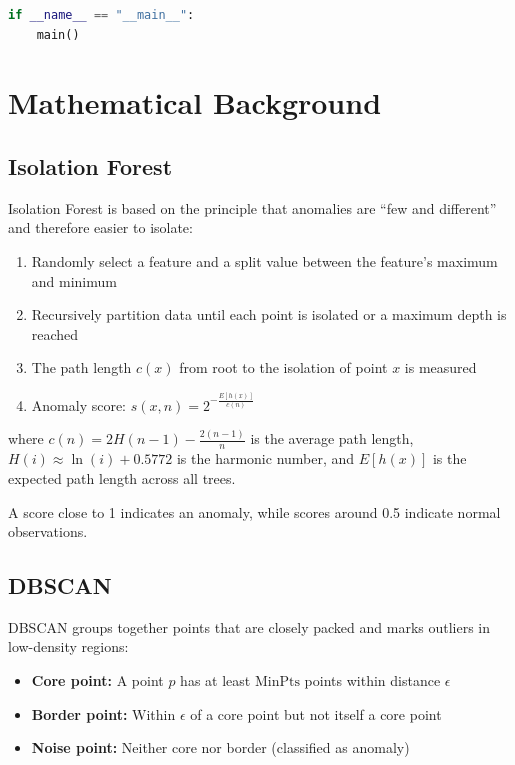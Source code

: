 \documentclass[12pt,a4paper]{report}
\begin{document}
\begin{lstlisting}[language=Python, caption={Main pipeline}]
if __name__ == "__main__":
    main()
\end{lstlisting}

\chapter{Mathematical Background}
\label{app:math}

\section{Isolation Forest}

Isolation Forest is based on the principle that anomalies are ``few and different'' and therefore easier to isolate:

\begin{enumerate}
    \item Randomly select a feature and a split value between the feature's maximum and minimum
    \item Recursively partition data until each point is isolated or a maximum depth is reached
    \item The path length $c(x)$ from root to the isolation of point $x$ is measured
    \item Anomaly score: $s(x, n) = 2^{-\frac{E[h(x)]}{c(n)}}$
\end{enumerate}

where $c(n) = 2H(n-1) - \frac{2(n-1)}{n}$ is the average path length, $H(i) \approx \ln(i) + 0.5772$ is the harmonic number, and $E[h(x)]$ is the expected path length across all trees.

A score close to 1 indicates an anomaly, while scores around 0.5 indicate normal observations.

\section{DBSCAN}

DBSCAN groups together points that are closely packed and marks outliers in low-density regions:

\begin{itemize}
    \item \textbf{Core point:} A point $p$ has at least $\text{MinPts}$ points within distance $\epsilon$
    \item \textbf{Border point:} Within $\epsilon$ of a core point but not itself a core point
    \item \textbf{Noise point:} Neither core nor border (classified as anomaly)
\end{itemize}
\end{document}
